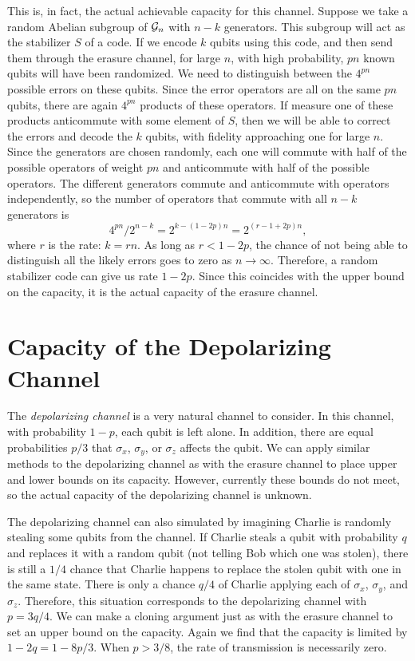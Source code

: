 \documentclass{report}
\newcommand{\G}{{\cal G}}
\newcommand{\X}{\sigma_x}
\newcommand{\Z}{\sigma_z}
\newcommand{\Y}{\sigma_y}
\begin{document}
This is, in fact, the actual achievable capacity for this channel.  Suppose we 
take a random Abelian subgroup of $\G_n$ with $n-k$ generators.  This 
subgroup will act as the stabilizer $S$ of a code.  If we encode $k$ qubits 
using this code, and then send them through the erasure channel, for large 
$n$, with high probability, $pn$ known qubits will have been randomized.  
We need to distinguish between the $4^{pn}$ possible errors on these 
qubits.  Since the error operators are all on the same $pn$ qubits, there are 
again $4^{pn}$ products of these operators.  If measure one of these products
anticommute with some element of $S$, then we will be able to correct the 
errors and decode the $k$ qubits, with fidelity approaching one for large $n$.  
Since the generators are chosen randomly, each one will commute with half of 
the possible operators of weight $pn$ and anticommute with half of the possible 
operators.  The different generators commute and anticommute with operators 
independently, so the number of operators that commute with all $n-k$ 
generators is
\begin{equation}
4^{pn} / 2^{n-k} = 2^{k - (1-2p)n} = 2^{(r - 1 + 2p) n},
\end{equation}
where $r$ is the rate: $k = rn$.  As long as $r < 1 - 2p$, the chance of not 
being able to distinguish all the likely errors goes to zero as $n \rightarrow 
\infty$.  Therefore, a random stabilizer code can give us rate $1-2p$.  Since 
this coincides with the upper bound on the capacity, it is the actual 
capacity of the erasure channel.

\section{Capacity of the Depolarizing Channel}
\label{depolarizing}

The {\em depolarizing channel} is a very natural channel to consider.  In this 
channel, with probability $1-p$, each qubit is left alone.  In addition, there 
are equal probabilities $p/3$ that $\X$, $\Y$, or $\Z$ affects the qubit.  We 
can apply similar methods to the depolarizing channel as with the erasure 
channel to place upper and lower bounds on its capacity.  However, 
currently these bounds do not meet, so the actual capacity of the 
depolarizing channel is unknown.

The depolarizing channel can also simulated by imagining Charlie is 
randomly stealing some qubits from the channel.  If Charlie steals a qubit 
with probability $q$ and replaces it with a random qubit (not telling Bob 
which one was stolen), there is still a $1/4$ chance that Charlie happens to 
replace the stolen qubit with one in the same state.  There is only a chance 
$q/4$ of Charlie applying each of $\X$, $\Y$, and $\Z$.  Therefore, this 
situation corresponds to the depolarizing channel with $p = 3q/4$.  We can 
make a cloning argument just as with the erasure channel to set an upper 
bound on the capacity.  Again we find that the capacity is limited by $1-2q 
= 1- 8p/3$.  When $p > 3/8$, the rate of transmission is necessarily zero.
\end{document}
